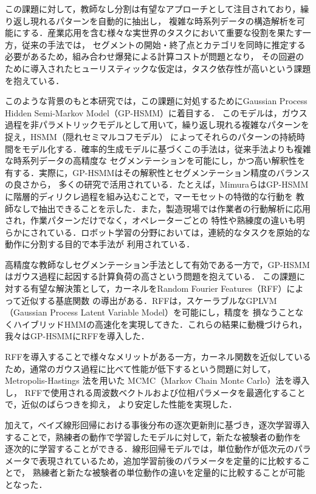 \documentclass[conference]{IEEEtran}
\begin{document}
この課題に対して，教師なし分割\cite{Fox2011, Matsubara2014, Sener2018, Bojanowski2014, Huang2016, Richard2017}は有望なアプローチとして注目されており，繰り返し現れるパターンを自動的に抽出し，
複雑な時系列データの構造解析を可能にする．産業応用を含む様々な実世界のタスクにおいて重要な役割を果たす一方，従来の手法では，
セグメントの開始・終了点とカテゴリを同時に推定する必要があるため，組み合わせ爆発による計算コストが問題となり，
その回避のために導入されたヒューリスティックな仮定は，タスク依存性が高いという課題を抱えている．

このような背景のもと本研究では，この課題に対処するためにGaussian Process Hidden Semi-Markov Model（GP-HSMM）\cite{Nakamura2017}に着目する．
このモデルは，ガウス過程を非パラメトリックモデルとして用いて，繰り返し現れる複雑なパターンを捉え，HSMM（隠れセミマルコフモデル）
によってそれらのパターンの持続時間をモデル化する．確率的生成モデルに基づくこの手法は，従来手法よりも複雑な時系列データの高精度な
セグメンテーションを可能にし，かつ高い解釈性を有する．実際に，GP-HSMMはその解釈性とセグメンテーション精度のバランスの良さから，
多くの研究で活用されている．たとえば，MimuraらはGP-HSMMに階層的ディリクレ過程を組み込むことで，マーモセットの特徴的な行動を
教師なしで抽出できることを示した\cite{Mimura2024}．また，製造現場では作業者の行動解析に応用され，作業パターンだけでなく，オペレーターごとの
特性や熟練度の違いも明らかにされている\cite{Saito2023a}．ロボット学習の分野においては，連続的なタスクを原始的な動作に分割する目的で本手法が
利用されている\cite{Mo2023}．

高精度な教師なしセグメンテーション手法として有効である一方で，GP-HSMMはガウス過程に起因する計算負荷の高さという問題を抱えている．
この課題に対する有望な解決策として，カーネルをRandom Fourier Features（RFF）によって近似する基底関数
の導出がある\cite{Rahimi2007}．RFFは，スケーラブルなGPLVM（Gaussian Process Latent Variable Model）\cite{Zhang2023}\cite{Li2024}を可能にし，精度を
損なうことなくハイブリッドHMMの高速化を実現してきた\cite{Jung2020}．これらの結果に動機づけられ，我々はGP-HSMMにRFFを導入した．

RFFを導入することで様々なメリットがある一方，カーネル関数を近似しているため，通常のガウス過程に比べて性能が低下するという問題に対して，Metropolis-Hastings 法を用いた MCMC（Markov Chain Monte Carlo）法\cite{Hastings1970}を導入し，
RFFで使用される周波数ベクトルおよび位相パラメータを最適化することで，近似のばらつきを抑え，
より安定した性能を実現した．

加えて，ベイズ線形回帰における事後分布の逐次更新則に基づき，逐次学習\cite{Broderick2013}導入することで，熟練者の動作で学習したモデルに対して，新たな被験者の動作を
逐次的に学習することができる．線形回帰モデルでは，単位動作が低次元のパラメータで表現されているため，追加学習前後のパラメータを定量的に比較することで，
熟練者と新たな被験者の単位動作の違いを定量的に比較することが可能となった．
\end{document}
